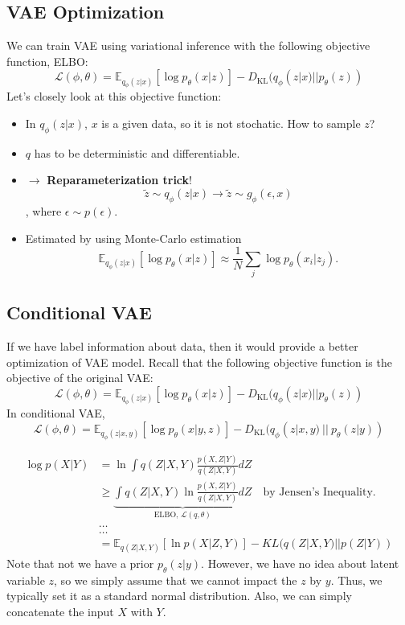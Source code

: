 \subsection{VAE Optimization}
We can train VAE using variational inference with the following objective function, ELBO:
$$\mathcal{L}(\phi,\theta) = \mathbb{E}_{q_{\phi}(z|x)}[\log p_{\theta}(x|z)] - D_{\textrm{KL}}(q_{\phi}(z|x)||p_{\theta}(z))$$
Let's closely look at this objective function:
\begin{itemize}
	\item In $q_{\phi}(z|x)$, $x$ is a given data, so it is not stochatic. How to sample $z$?
	\item $q$ has to be deterministic and differentiable. 
	\item[] $\to$ \textbf{Reparameterization trick}!
		$$\tilde{z}\sim q_\phi(z|x) \to \tilde{z}\sim g_{\phi}(\epsilon, x)$$, where $\epsilon\sim p(\epsilon).$

	\item Estimated by using Monte-Carlo estimation 
		$$\mathbb{E}_{q_{\phi}(z|x)}[\log p_{\theta}(x|z)]\approx \frac{1}{N}\sum_j \log p_{\theta}(x_i|z_j).$$
\end{itemize}

\subsection{Conditional VAE}
If we have label information about data, then it would provide a better optimization of VAE model. Recall that the following objective function is the objective of the original VAE:
$$\mathcal{L}(\phi,\theta) = \mathbb{E}_{q_{\phi}(z|x)}[\log p_{\theta}(x|z)] - D_{\textrm{KL}}(q_{\phi}(z|x)||p_{\theta}(z))$$
In conditional VAE, 
$$\mathcal{L}(\phi,\theta) = \mathbb{E}_{q_{\phi}(z|x, y)}[\log p_{\theta}(x|y, z)] - D_{\textrm{KL}}(q_{\phi}(z|x, y)\ ||\ p_{\theta}(z|y))$$

\begin{align}
	\log p(X|Y) & = \ln\int q(Z|X, Y) \frac{p(X, Z|Y)}{q(Z|X, Y)}dZ\\
					 & \geq \underbrace{\int q(Z|X, Y) \ln\frac{p(X, Z|Y)}{q(Z|X, Y)}dZ}_{\textrm{ELBO, } \mathcal{L}(q,\theta)} \quad\textrm{by Jensen's Inequality.}\\
					 &\dots\\
					 &\dots\\
					 &= \mathbb{E}_{q(Z|X,Y)} [\ln p(X|Z,Y)]  - KL(q(Z|X,Y)||p(Z|Y)) 
\end{align}
Note that not we have a prior $p_{\theta}(z|y)$. However, we have no idea about latent variable $z$, so we simply assume that we cannot impact the $z$ by $y$. Thus, we typically set it as a standard normal distribution. Also, we can simply concatenate the input $X$ with $Y$. 

